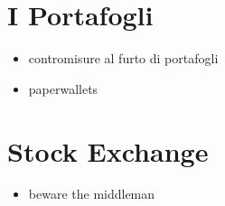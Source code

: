 \section{I Portafogli}\label{i-portafogli}

\begin{itemize}
\itemsep1pt\parskip0pt
\item
  contromisure al furto di portafogli
\item
  paperwallets
\end{itemize}

\section{Stock Exchange}\label{stock-exchange}

\begin{itemize}
\itemsep1pt\parskip0pt
\item
  beware the middleman
\end{itemize}

